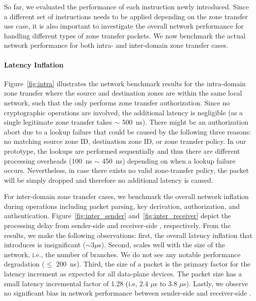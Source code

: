 So far, we evaluated the performance of each instruction newly introduced. Since a different
set of instructions needs to be applied depending on the zone transfer use case, it is also
important to investigate the overall network performance for handling different types of zone
transfer packets. We now benchmark the actual network performance for both intra- and inter-domain
zone transfer cases.

\paragraph{Latency Inflation}
Figure~\ref{fig:intra} illustrates the network benchmark results for the intra-domain zone
transfer where the source and destination zones are within the same local network, such that
the \tp only performs zone transfer authorization. Since no cryptographic operations are involved,
the additional latency is negligible (as a single legitimate zone transfer takes $\sim$
\SI{500}{ns}). There might be an authorization abort due to a lookup failure that could be
caused by the following three reasons: no matching source zone ID, destination zone ID, or
zone transfer policy. In our prototype, the lookups are performed sequentially and thus
there are different processing overheads (\SI{100}{ns} $\sim$ \SI{450}{ns}) depending on when a
lookup failure occurs. Nevertheless, in case there exists no valid zone-transfer policy, the
packet will be simply dropped and therefore no additional latency is caused.

For inter-domain zone transfer cases, we benchmark the overall network inflation during \tp
operations including packet parsing, key derivation, authorization, and authentication.
Figure~\ref{fig:inter_sender} and~\ref{fig:inter_receiver} depict the processing delay from
sender-side \tp and receiver-side \tp, respectively.
From the results, we make the following observations: first, the overall latency inflation that
\name introduces is insignificant ($\sim 3 \mu$s). Second, \name scales well with the size of the
network, i.e., the number of branches. We do not see any notable performance degradation
($\leq$ \SI{200}{ns}). Third, the size of a packet is the primary factor for the latency increment
as expected for all data-plane devices. The packet size has a small latency incremental factor of
1.28 (i.e, 2.4 $\mu$s to 3.8 $\mu$s). Lastly, we observe no significant bias in network
performance between sender-side and receiver-side \tps.


